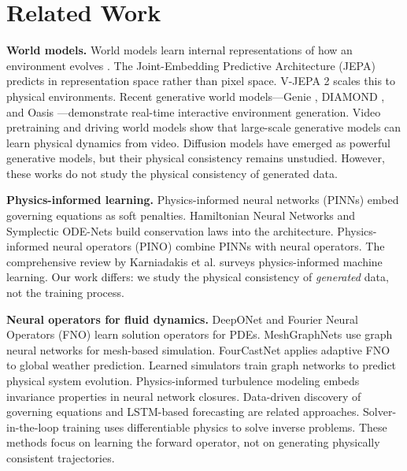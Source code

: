 \documentclass[reprint,aps,pre]{revtex4-2}
\begin{document}
\section{Related Work}

\textbf{World models.} World models learn internal representations of how an environment evolves \cite{ha2018worldmodels,hafner2020dreamer,hafner2023dreamerv3}. The Joint-Embedding Predictive Architecture (JEPA) \cite{lecun2022path,assran2023ijepa,bardes2024vjepa} predicts in representation space rather than pixel space. V-JEPA 2 \cite{assran2025vjepa2} scales this to physical environments. Recent generative world models---Genie \cite{bruce2024genie}, DIAMOND \cite{alonso2024diamond}, and Oasis \cite{patel2024oasis}---demonstrate real-time interactive environment generation. Video pretraining \cite{baker2022vpt} and driving world models \cite{hu2023gaia1,wang2023dreamer} show that large-scale generative models can learn physical dynamics from video. Diffusion models \cite{ho2020denoising,song2021scorebased,rombach2022high} have emerged as powerful generative models, but their physical consistency remains unstudied. However, these works do not study the physical consistency of generated data.

\textbf{Physics-informed learning.} Physics-informed neural networks (PINNs) \cite{raissi2019physics,lagaris1998artificial} embed governing equations as soft penalties. Hamiltonian Neural Networks \cite{greydanus2019hnn} and Symplectic ODE-Nets \cite{zhong2020symoden} build conservation laws into the architecture. Physics-informed neural operators (PINO) \cite{li2021pino} combine PINNs with neural operators. The comprehensive review by Karniadakis et al. \cite{karniadakis2021physics} surveys physics-informed machine learning. Our work differs: we study the physical consistency of \textit{generated} data, not the training process.

\textbf{Neural operators for fluid dynamics.} DeepONet \cite{lu2021deeponet} and Fourier Neural Operators (FNO) \cite{li2021fno} learn solution operators for PDEs. MeshGraphNets \cite{pfaff2021meshgraphnets} use graph neural networks for mesh-based simulation. FourCastNet \cite{pathak2022fourcastnet} applies adaptive FNO to global weather prediction. Learned simulators \cite{stachenfeld2021learned,sanchez2020learning} train graph networks to predict physical system evolution. Physics-informed turbulence modeling \cite{ling2016reynolds} embeds invariance properties in neural network closures. Data-driven discovery of governing equations \cite{brunton2016discovering} and LSTM-based forecasting \cite{vlachas2018data} are related approaches. Solver-in-the-loop training \cite{um2020solver} uses differentiable physics to solve inverse problems. These methods focus on learning the forward operator, not on generating physically consistent trajectories.
\end{document}
